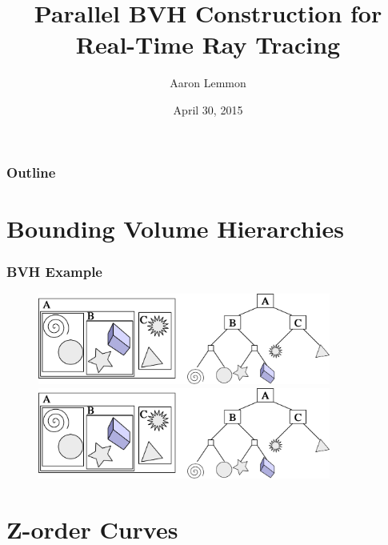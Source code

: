 \documentclass{beamer}
\begin{document}
\title{Parallel BVH Construction for Real-Time Ray Tracing}
\author{Aaron Lemmon}
\date[]  
{April 30, 2015}

\begin{frame}
  \titlepage
\end{frame}

\begin{frame}

  \frametitle{Outline}
\tableofcontents
\end{frame}

\section{Bounding Volume Hierarchies}

\begin{frame}
  \frametitle{BVH Example}
\begin{figure}
\includegraphics[height=30mm]{bvh_diagram.pdf}
\includegraphics[height=30mm]{bvh_tree.pdf}
\end{figure}
\end{frame}

\section{Z-order Curves}
\end{document}
